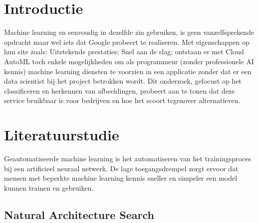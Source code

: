 
\section{Introductie} %
\label{sec:introductie}

Machine learning en eenvoudig in dezelfde zin gebruiken, is geen vanzelfsprekende opdracht maar wel iets dat Google probeert te realiseren. Met eigenschappen op hun site \autocite{Google2019} zoals: Uitstekende prestaties; Snel aan de slag; ontstaan er met Cloud AutoML toch enkele mogelijkheden om als programmeur (zonder professionele AI kennis) machine learning diensten te voorzien in een applicatie zonder dat er een data scientist bij het project betrokken wordt. Dit onderzoek, gefocust op het classificeren en herkennen van afbeeldingen, probeert aan te tonen dat deze service bruikbaar is voor bedrijven en hoe het scoort tegenover alternatieven.


\section{Literatuurstudie}
\label{sec:literatuurstudie}


Geautomatiseerde machine learning is het automatiseren van het trainingsproces bij een artificieel neuraal netwerk. De lage toegangsdrempel zorgt ervoor dat mensen met beperkte machine learning kennis sneller en simpeler een model kunnen trainen en gebruiken.

\subsection{Natural Architecture Search}

